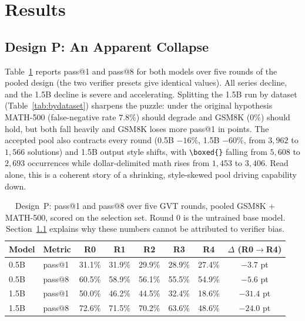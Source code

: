 \documentclass[runningheads]{llncs}
\begin{document}
\section{Results}
\label{sec:results}

\subsection{Design P: An Apparent Collapse}
\label{sec:pooled}

Table~\ref{tab:passk} reports pass@1 and pass@8 for both models over five rounds
of the pooled design (the two verifier presets give identical values). All series
decline, and the 1.5B decline is severe and accelerating. Splitting the 1.5B run
by dataset (Table~\ref{tab:bydataset}) sharpens the puzzle: under the original
hypothesis MATH-500 (false-negative rate $7.8\%$) should degrade and GSM8K
($0\%$) should hold, but both fall heavily and GSM8K loses more pass@1 in points.
The accepted pool also contracts every round (0.5B $-16\%$, 1.5B $-60\%$, from
$3{,}962$ to $1{,}566$ solutions) and 1.5B output style shifts, with
\verb|\boxed{}| falling from $5{,}608$ to $2{,}693$ occurrences while
dollar-delimited math rises from $1{,}453$ to $3{,}406$. Read alone, this is a
coherent story of a shrinking, style-skewed pool driving capability down.

\begin{table}[t]
\caption{Design~P: pass@1 and pass@8 over five GVT rounds, pooled
GSM8K + MATH-500, scored on the selection set. Round 0 is the untrained
base model. Section~\ref{sec:pooled} explains why these numbers cannot
be attributed to verifier bias.}
\label{tab:passk}
\centering
\begin{tabular}{llccccc c}
\toprule
Model & Metric & R0 & R1 & R2 & R3 & R4 & $\Delta$ (R0$\to$R4) \\
\midrule
0.5B & pass@1 & 31.1\% & 31.9\% & 29.9\% & 28.9\% & 27.4\% & $-3.7$ pt \\
0.5B & pass@8 & 60.5\% & 58.9\% & 56.1\% & 55.5\% & 54.9\% & $-5.6$ pt \\
1.5B & pass@1 & 50.0\% & 46.2\% & 44.5\% & 32.4\% & 18.6\% & $\mathbf{-31.4}$ pt \\
1.5B & pass@8 & 72.6\% & 71.5\% & 70.2\% & 63.6\% & 48.6\% & $\mathbf{-24.0}$ pt \\
\bottomrule
\end{tabular}
\end{table}
\end{document}
